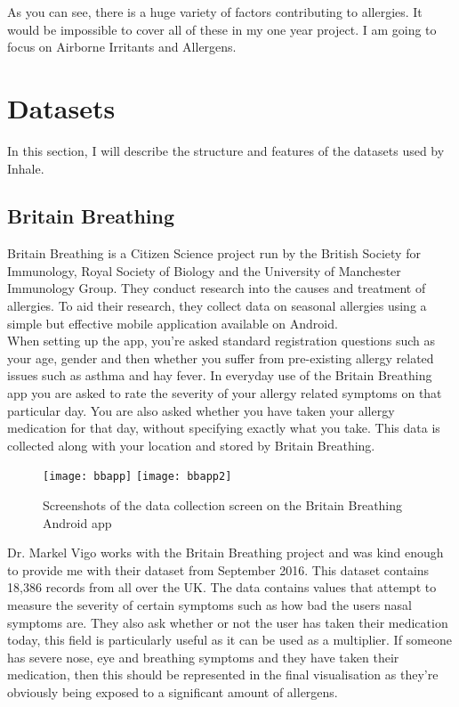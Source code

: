 As you can see, there is a huge variety of factors contributing to allergies. It would be impossible to cover all of these in my one year project. I am going to focus on Airborne Irritants and Allergens.


\section{Datasets}

In this section, I will describe the structure and features of the datasets used by Inhale.\\

\subsection{Britain Breathing}

Britain Breathing is a Citizen Science project run by the British Society for Immunology, Royal Society of Biology and the University of Manchester Immunology Group. They conduct research into the causes and treatment of allergies. To aid their research, they collect data on seasonal allergies using a simple but effective mobile application available on Android.\\

When setting up the app, you're asked standard registration questions such as your age, gender and then whether you suffer from pre-existing allergy related issues such as asthma and hay fever. In everyday use of the Britain Breathing app you are asked to rate the severity of your allergy related symptoms on that particular day. You are also asked whether you have taken your allergy medication for that day, without specifying exactly what you take. This data is collected along with your location and stored by Britain Breathing.

\begin{figure}[H]
\begin{center}
\texttt{[image: bbapp]}
\texttt{[image: bbapp2]}
\caption{Screenshots of the data collection screen on the Britain Breathing Android app}
\label{fig:bbscrn}
\end{center}
\end{figure}

Dr. Markel Vigo works with the Britain Breathing project and was kind enough to provide me with their dataset from September 2016. This dataset contains 18,386 records from all over the UK. The data contains values that attempt to measure the severity of certain symptoms such as how bad the users nasal symptoms are. They also ask whether or not the user has taken their medication today, this field is particularly useful as it can be used as a multiplier. If someone has severe nose, eye and breathing symptoms and they have taken their medication, then this should be represented in the final visualisation as they're obviously being exposed to a significant amount of allergens.\\

